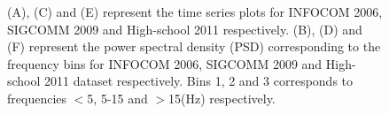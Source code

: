 \begin{figure}[!ht]
  
  
  
  
  
  
  

  
  
   \caption{\label{fig_all_dataset} (A), (C) and (E) represent the time series plots for INFOCOM 2006, SIGCOMM 2009 and High-school 2011 respectively. (B), (D) and (F) represent the power spectral density (PSD) corresponding to the frequency bins for INFOCOM 2006, SIGCOMM 2009 and High-school 2011 dataset respectively. Bins 1, 2 and 3 corresponds to frequencies $<$5, 5-15 and $>$15(Hz) respectively.}
%   
 \end{figure}
